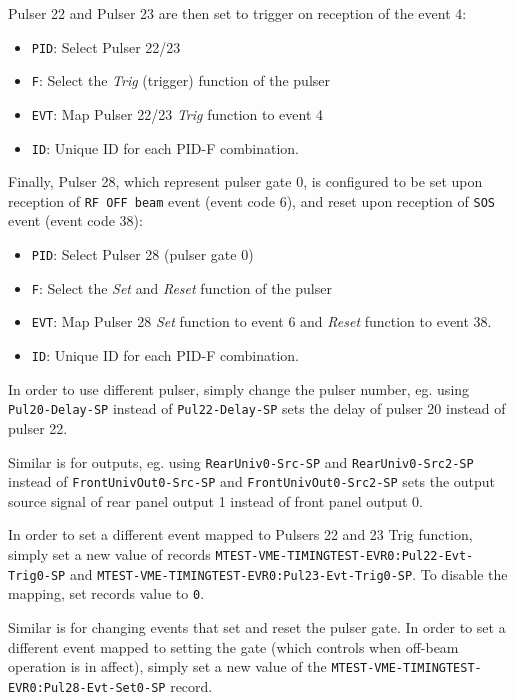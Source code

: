 \documentclass[12pt,a4paper]{article}
\begin{document}
Pulser 22 and Pulser 23 are then set to trigger on reception of the event 4:
\begin{itemize}
	\item \texttt{PID}: Select Pulser 22/23
	\item \texttt{F}: Select the \textit{Trig} (trigger) function of the pulser
	\item \texttt{EVT}: Map Pulser 22/23 \textit{Trig} function to event 4
	\item \texttt{ID}: Unique ID for each PID-F combination.
\end{itemize}

Finally, Pulser 28, which represent pulser gate 0, is configured to be set upon reception of \texttt{RF OFF beam} event (event code 6), and reset upon reception of \texttt{SOS} event (event code 38):
\begin{itemize}
	\item \texttt{PID}: Select Pulser 28 (pulser gate 0)
	\item \texttt{F}: Select the \textit{Set} and \textit{Reset} function of the pulser
	\item \texttt{EVT}: Map Pulser 28 \textit{Set} function to event 6 and \textit{Reset} function to event 38.
	\item \texttt{ID}: Unique ID for each PID-F combination.
\end{itemize}

In order to use different pulser, simply change the pulser number, eg. using \texttt{Pul20-Delay-SP} instead of \texttt{Pul22-Delay-SP} sets the delay of pulser 20 instead of pulser 22.

Similar is for outputs, eg. using \texttt{RearUniv0-Src-SP} and \texttt{RearUniv0-Src2-SP} instead of \texttt{FrontUnivOut0-Src-SP} and \texttt{FrontUnivOut0-Src2-SP} sets the output source signal of rear panel output 1 instead of front panel output 0. 

In order to set a different event mapped to Pulsers 22 and 23 Trig function, simply set a new value of records \texttt{MTEST-VME-TIMINGTEST-EVR0:Pul22-Evt-Trig0-SP} and \texttt{MTEST-VME-TIMINGTEST-EVR0:Pul23-Evt-Trig0-SP}. To disable the mapping, set records value to \texttt{0}.

Similar is for changing events that set and reset the pulser gate. In order to set a different event mapped to setting the gate (which controls when off-beam operation is in affect), simply set a new value of the \newline\texttt{MTEST-VME-TIMINGTEST-EVR0:Pul28-Evt-Set0-SP} record.
\end{document}
